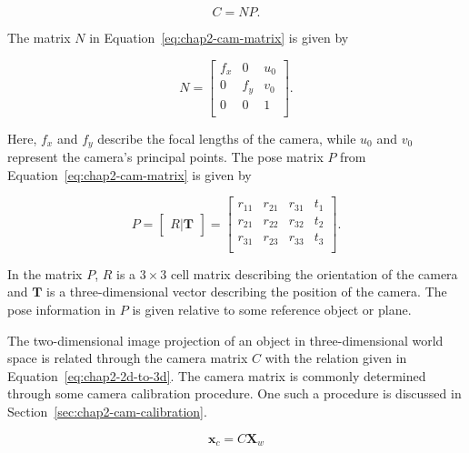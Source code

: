 \begin{equation}
  \label{eq:chap2-cam-matrix}
  C = 
  NP.
\end{equation}

The matrix $N$ in Equation~\ref{eq:chap2-cam-matrix} is given by

\begin{equation}
  \label{eq:chap2-cam-intrinsic}
  N = 
  \begin{bmatrix}
    f_x & 0   & u_0 \\
    0   & f_y & v_0 \\
    0   & 0   & 1   \\
  \end{bmatrix}.
\end{equation}

Here, $f_x$ and $f_y$ describe the focal lengths of the camera, while $u_0$ and $v_0$ represent the camera's principal points. The pose matrix $P$ from Equation~\ref{eq:chap2-cam-matrix} is given by

\begin{equation}
  \label{eq:chap2-cam-extrinsic}
  P = 
  \begin{bmatrix}
    R | \bm{T}
  \end{bmatrix}
  =
  \begin{bmatrix}
    r_{11} & r_{21} & r_{31} & t_1 \\
    r_{21} & r_{22} & r_{32} & t_2 \\
    r_{31} & r_{23} & r_{33} & t_3 \\
  \end{bmatrix}.
\end{equation}

In the matrix $P$, $R$ is a $3\times3$ cell matrix describing the orientation of the camera and $\bm{T}$ is a three-dimensional vector describing the position of the camera. The pose information in $P$ is given relative to some reference object or plane. 

The two-dimensional image projection of an object in three-dimensional world space is related through the camera matrix $C$ with the relation given in Equation~\ref{eq:chap2-2d-to-3d}. The camera matrix is commonly determined through some camera calibration procedure. One such a procedure is discussed in Section~\ref{sec:chap2-cam-calibration}.

\begin{equation}
  \label{eq:chap2-2d-to-3d}
  \bm{x}_c
  = C
  \bm{X}_w
\end{equation}

